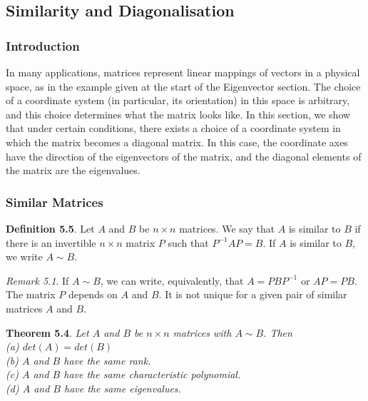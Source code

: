 \documentclass[
  letterpaper,
  DIV=11,
  numbers=noendperiod]{scrartcl}
\theoremstyle{remark}
\begin{document}
\subsection{Similarity and
Diagonalisation}\label{similarity-and-diagonalisation}

\subsubsection{Introduction}\label{introduction-1}

In many applications, matrices represent linear mappings of vectors in a
physical space, as in the example given at the start of the Eigenvector
section. The choice of a coordinate system (in particular, its
orientation) in this space is arbitrary, and this choice determines what
the matrix looks like. In this section, we show that under certain
conditions, there exists a choice of a coordinate system in which the
matrix becomes a diagonal matrix. In this case, the coordinate axes have
the direction of the eigenvectors of the matrix, and the diagonal
elements of the matrix are the eigenvalues.

\subsubsection{Similar Matrices}\label{similar-matrices}

\textbf{Definition 5.5}. Let \(A\) and \(B\) be \(n \times n\) matrices.
We say that \(A\) is similar to \(B\) if there is an invertible
\(n \times n\) matrix \(P\) such that \(P^{-1}AP = B\). If \(A\) is
similar to \(B\), we write \(A \sim B\).

\emph{Remark 5.1}. If \(A \sim B\), we can write, equivalently, that
\(A = PBP^{-1}\) or \(AP = PB\).\\
The matrix \(P\) depends on \(A\) and \(B\). It is not unique for a
given pair of similar matrices \(A\) and \(B\).

\textbf{Theorem 5.4}. \emph{Let \(A\) and \(B\) be \(n \times n\)
matrices with \(A \sim B\). Then\\
(a) \(det(A) = det(B)\)\\
(b) \(A\) and \(B\) have the same rank.\\
(c) \(A\) and \(B\) have the same characteristic polynomial.\\
(d) \(A\) and \(B\) have the same eigenvalues.}
\end{document}
